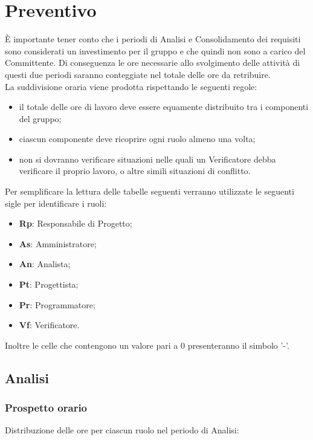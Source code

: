\section{Preventivo}
È importante tener conto che i periodi di Analisi e Consolidamento dei requisiti sono considerati un investimento per il gruppo e che quindi non sono a carico del Committente.
Di conseguenza le ore necessarie allo svolgimento delle attività di questi due periodi saranno conteggiate nel totale delle ore da retribuire. \\

La suddivisione oraria viene prodotta rispettando le seguenti regole:
\begin{itemize}
	\item il totale delle ore di lavoro deve essere equamente distribuito tra i componenti del gruppo;
	\item ciascun componente deve ricoprire ogni ruolo almeno una volta;
	\item non si dovranno verificare situazioni nelle quali un Verificatore debba verificare il proprio lavoro, o altre simili situazioni di conflitto.
\end{itemize}

Per semplificare la lettura delle tabelle seguenti verranno utilizzate le seguenti sigle per identificare i ruoli:
\begin{itemize}
	\item \textbf{Rp}: Responsabile di Progetto;
	\item \textbf{As}: Amministratore;
	\item \textbf{An}: Analista;
	\item \textbf{Pt}: Progettista;
	\item \textbf{Pr}: Programmatore;
	\item \textbf{Vf}: Verificatore.
\end{itemize}
Inoltre le celle che contengono un valore pari a 0 presenteranno il simbolo '-'.

\newpage

\subsection{Analisi}
	\subsubsection{Prospetto orario}
		Distribuzione delle ore per ciascun ruolo nel periodo di Analisi:


